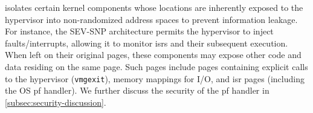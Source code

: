 




\thename isolates certain kernel components whose locations are inherently exposed to the hypervisor into non-randomized address spaces to prevent information leakage.
For instance, the SEV-SNP architecture permits the hypervisor to inject faults/interrupts, allowing it to monitor \glspl{isr} and their subsequent execution.
When left on their original pages, these components may expose other code and data residing on the same page.
Such pages include pages containing explicit calls to the hypervisor (\texttt{vmgexit}), memory mappings for I/O, and \gls{isr} pages (including the OS \gls{pf} handler).
We further discuss the security of the \gls{pf} handler in \cref{subsec:security-discussion}.






